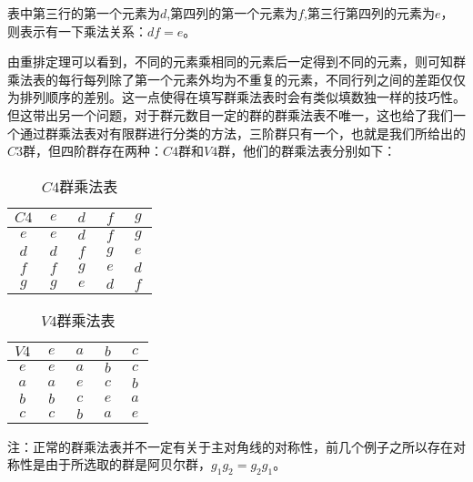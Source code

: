 表中第三行的第一个元素为$d$,第四列的第一个元素为$f$,第三行第四列的元素为$e$，则表示有一下乘法关系：$df=e$。

由重排定理可以看到，不同的元素乘相同的元素后一定得到不同的元素，则可知群乘法表的每行每列除了第一个元素外均为不重复的元素，不同行列之间的差距仅仅为排列顺序的差别。这一点使得在填写群乘法表时会有类似填数独一样的技巧性。但这带出另一个问题，对于群元数目一定的群的群乘法表不唯一，这也给了我们一个通过群乘法表对有限群进行分类的方法，三阶群只有一个，也就是我们所给出的$C3$群，但四阶群存在两种：$C4$群和$V4$群，他们的群乘法表分别如下：

\begin{table}[ht]
\centering
\caption{$C4$群乘法表}\label{tab_groupt_2}
\begin{tabular}{|c|c|c|c|c|}
\hline
$C4$ & $~e~$ & $~d~$ & $~f~$ & $~g~$ \\
\hline
$e$ & $e$ & $d$ & $f$ & $g$ \\
\hline
$d$ & $d$ & $f$ & $g$ & $e$ \\
\hline
$f$ & $f$ & $g$ & $e$ & $d$ \\
\hline
$g$ & $g$ & $e$ & $d$ & $f$ \\
\hline
\end{tabular}
\end{table}

\begin{table}[ht]
\centering
\caption{$V4$群乘法表}\label{tab_groupt_3}
\begin{tabular}{|c|c|c|c|c|}
\hline
$V4$ & $~e~$ & $~a~$ & $~b~$ & $~c~$ \\
\hline
$e$ & $e$ & $a$ & $b$ & $c$ \\
\hline
$a$ & $a$ & $e$ & $c$ & $b$ \\
\hline
$b$ & $b$ & $c$ & $e$ & $a$ \\
\hline
$c$ & $c$ & $b$ & $a$ & $e$ \\
\hline
\end{tabular}
\end{table}

注：正常的群乘法表并不一定有关于主对角线的对称性，前几个例子之所以存在对称性是由于所选取的群是阿贝尔群，$g_1g_2=g_2g_1$。

